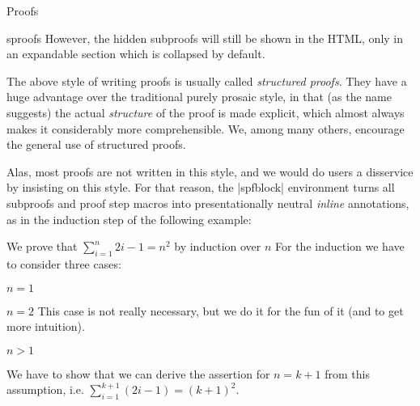 \begin{sfragment}{Proofs}
\begin{smodule}{sproofs}
  However, the hidden subproofs will still be shown in the HTML,
  only in an expandable section which is collapsed by default.


The above style of writing proofs is usually called \emph{structured proofs}.
They have a huge advantage over the traditional purely prosaic style,
in that (as the name suggests) the actual \emph{structure} of the proof
is made explicit, which almost always makes it considerably more 
comprehensible. We, among many others, encourage the general use of 
structured proofs.

Alas, most proofs are not written in this style, and we would
do users a disservice by insisting on this style. For that reason,
the |spfblock| environment turns all subproofs and proof step
macros into presentationally neutral \emph{inline} annotations,
as in the induction step of the following example:

\begin{latexcode}
\begin{sproof}[id=simple-proof,method=induction]
   {We prove that $\sum_{i=1}^n{2i-1}=n^{2}$ by induction over $n$}
  For the induction we have to consider three cases: %
   \begin{subproof}{$n=1$}
   \end{subproof}
   \begin{subproof}{$n=2$}
        This case is not really necessary, but we do it for the
        fun of it (and to get more intuition).
   \end{subproof}
   \begin{subproof}{$n>1$}\begin{spfblock}
      
        We have to show that we can derive the assertion for $n=k+1$ from
        this assumption, i.e. $\sum_{i=1}^{k+1}{(2i-1)}=(k+1)^{2}$.

   \end{spfblock}\end{subproof}
\end{sproof}
\end{latexcode}



\end{smodule}
\end{sfragment}

